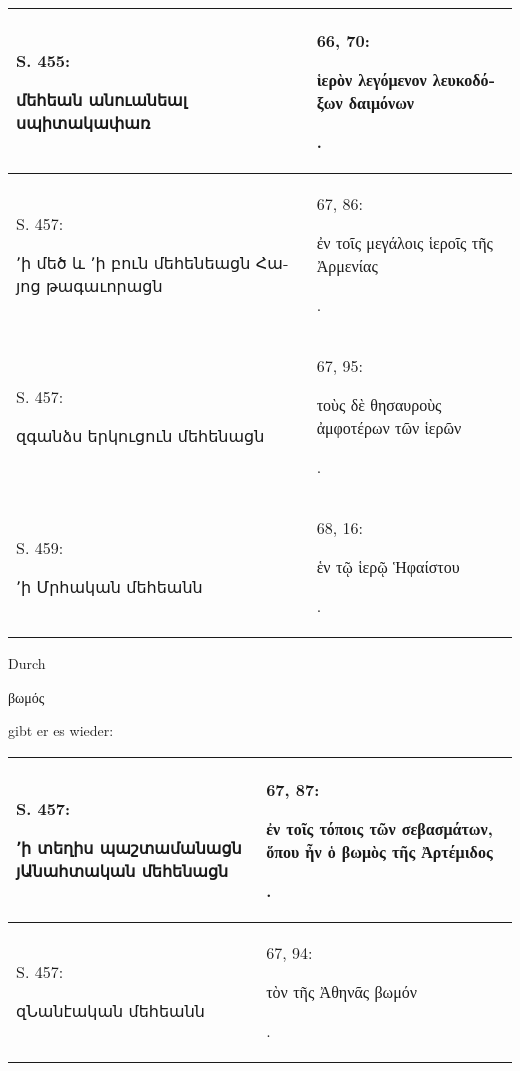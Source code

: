 \documentclass{article}
\begin{document}
{\begin{table}[H]
\begin{tabular}{p{45mm}|p{45mm}}
        S. 455: \begin{armenian}մեհեան անուանեալ սպիտակափառ\end{armenian} & 66, 70: \begin{greek}ἱερὸν λεγόμενον λευκοδόξων δαιμόνων\end{greek}.   \\ \hline
        S. 457: \begin{armenian}՚ի մեծ և ՚ի բուն մեհենեացն Հայոց թագաւորացն\end{armenian} & 67, 86: \begin{greek}ἐν τοῖς μεγάλοις ἱεροῖς τῆς Ἀρμενίας\end{greek}.   \\ \hline
        S. 457: \begin{armenian}զգանձս երկուցուն մեհենացն\end{armenian} & 67, 95: \begin{greek}τοὺς δὲ θησαυροὺς ἀμφοτέρων τῶν ἱερῶν\end{greek}.   \\ \hline
        S. 459: \begin{armenian}՚ի Մրհական մեհեանն\end{armenian} & 68, 16: \begin{greek}ἑν τῷ ἱερῷ Ἡφαίστου\end{greek}. \\ \hline
    \end{tabular}
\end{table}
\hspace*{5mm}Durch \begin{greek}βωμός\end{greek} gibt er es wieder:  
\begin{table}[H]
    \centering
    \tiny
    \begin{tabular}{p{45mm}|p{45mm}}
    \hline
        S. 457: \begin{armenian}՚ի տեղիս պաշտամանացն յԱնահտական մեհենացն\end{armenian} & 67, 87: \begin{greek}ἐν τοῖς τόποις τῶν σεβασμάτων, ὅπου ἦν ὁ βωμὸς τῆς Ἀρτέμιδος\end{greek}.   \\ \hline
        S. 457: \begin{armenian}զՆանէական մեհեանն\end{armenian} & 67, 94: \begin{greek}τὸν τῆς Ἀθηνᾶς βωμόν\end{greek}.   \\ \hline

\end{tabular}
\end{table}}
\end{document}
